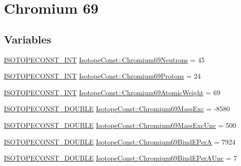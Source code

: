 \hypertarget{group___isotope_const-_chromium-_cr69}{}\section{Chromium 69}
\label{group___isotope_const-_chromium-_cr69}
\subsection*{Variables}
\begin{DoxyCompactItemize}
\item 
\mbox{\hyperlink{group___isotope_const-_macros_ga5f18360b3e99483a35c32d789e62621c}{I\+S\+O\+T\+O\+P\+E\+C\+O\+N\+S\+T\+\_\+\+I\+NT}} \mbox{\hyperlink{group___isotope_const-_chromium-_cr69_gad4dddf0b8c11c06e57a21baed8fdcba3}{Isotope\+Const\+::\+Chromium69\+Neutrons}} = 45
\item 
\mbox{\hyperlink{group___isotope_const-_macros_ga5f18360b3e99483a35c32d789e62621c}{I\+S\+O\+T\+O\+P\+E\+C\+O\+N\+S\+T\+\_\+\+I\+NT}} \mbox{\hyperlink{group___isotope_const-_chromium-_cr69_ga52329eed98ddef5f6b4d1d3c1754992f}{Isotope\+Const\+::\+Chromium69\+Protons}} = 24
\item 
\mbox{\hyperlink{group___isotope_const-_macros_ga5f18360b3e99483a35c32d789e62621c}{I\+S\+O\+T\+O\+P\+E\+C\+O\+N\+S\+T\+\_\+\+I\+NT}} \mbox{\hyperlink{group___isotope_const-_chromium-_cr69_ga2a1ca80418b5cfddf949465be388fc8b}{Isotope\+Const\+::\+Chromium69\+Atomic\+Weight}} = 69
\item 
\mbox{\hyperlink{group___isotope_const-_macros_ga8f45a7272ce02c0b4c65c44636ed719a}{I\+S\+O\+T\+O\+P\+E\+C\+O\+N\+S\+T\+\_\+\+D\+O\+U\+B\+LE}} \mbox{\hyperlink{group___isotope_const-_chromium-_cr69_gae082d850c2fb63fce80f2ab3bdd67ee9}{Isotope\+Const\+::\+Chromium69\+Mass\+Exc}} = -\/8580
\item 
\mbox{\hyperlink{group___isotope_const-_macros_ga8f45a7272ce02c0b4c65c44636ed719a}{I\+S\+O\+T\+O\+P\+E\+C\+O\+N\+S\+T\+\_\+\+D\+O\+U\+B\+LE}} \mbox{\hyperlink{group___isotope_const-_chromium-_cr69_ga1fe0856076c6db074283e820964d0bbf}{Isotope\+Const\+::\+Chromium69\+Mass\+Exc\+Unc}} = 500
\item 
\mbox{\hyperlink{group___isotope_const-_macros_ga8f45a7272ce02c0b4c65c44636ed719a}{I\+S\+O\+T\+O\+P\+E\+C\+O\+N\+S\+T\+\_\+\+D\+O\+U\+B\+LE}} \mbox{\hyperlink{group___isotope_const-_chromium-_cr69_ga1a571ffca49242b0e59b2392f07d742a}{Isotope\+Const\+::\+Chromium69\+Bind\+E\+PerA}} = 7924
\item 
\mbox{\hyperlink{group___isotope_const-_macros_ga8f45a7272ce02c0b4c65c44636ed719a}{I\+S\+O\+T\+O\+P\+E\+C\+O\+N\+S\+T\+\_\+\+D\+O\+U\+B\+LE}} \mbox{\hyperlink{group___isotope_const-_chromium-_cr69_gabe36d9d0bf1840393eba6204e2d975ff}{Isotope\+Const\+::\+Chromium69\+Bind\+E\+Per\+A\+Unc}} = 7

\end{DoxyCompactItemize}
